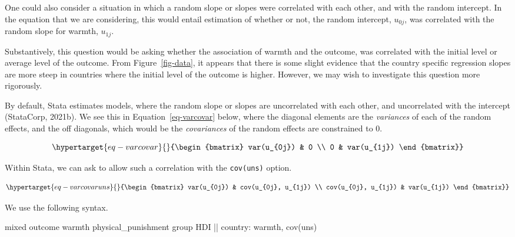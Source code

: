 \documentclass[
  letterpaper,
  DIV=11,
  numbers=noendperiod]{scrreprt}
\newenvironment{Shaded}{\begin{snugshade}}{\end{snugshade}}
\newcommand{\FunctionTok}[1]{\textcolor[rgb]{0.28,0.35,0.67}{#1}}
\newcommand{\NormalTok}[1]{\textcolor[rgb]{0.00,0.23,0.31}{#1}}
\begin{document}
One could also consider a situation in which a random slope or slopes
were correlated with each other, and with the random intercept. In the
equation that we are considering, this would entail estimation of
whether or not, the random intercept, \(u_{0j}\), was correlated with
the random slope for warmth, \(u_{1j}\).

Substantively, this question would be asking whether the association of
warmth and the outcome, was correlated with the initial level or average
level of the outcome. From Figure~\ref{fig-data}, it appears that there
is some slight evidence that the country specific regression slopes are
more steep in countries where the initial level of the outcome is
higher. However, we may wish to investigate this question more
rigorously.

By default, Stata estimates models, where the random slope or slopes are
uncorrelated with each other, and uncorrelated with the intercept
(StataCorp, 2021b). We see this in Equation~\ref{eq-varcovar} below,
where the diagonal elements are the \emph{variances} of each of the
random effects, and the off diagonals, which would be the
\emph{covariances} of the random effects are constrained to 0.

\begin{equation}\protect\hypertarget{eq-varcovar}{}{\begin{bmatrix}
var(u_{0j}) & 0 \\
0 & var(u_{1j}) 
\end{bmatrix}}\label{eq-varcovar}\end{equation}

Within Stata, we can ask to allow such a correlation with the
\texttt{cov(uns)} option.

\begin{equation}\protect\hypertarget{eq-varcovaruns}{}{\begin{bmatrix}
var(u_{0j}) & cov(u_{0j}, u_{1j}) \\
cov(u_{0j}, u_{1j}) & var(u_{1j}) 
\end{bmatrix}}\label{eq-varcovaruns}\end{equation}

We use the following syntax.

\begin{Shaded}
\begin{Highlighting}[]

\NormalTok{mixed outcome warmth physical\_punishment }\FunctionTok{group}\NormalTok{ HDI || country: warmth, cov(uns)}
\end{Highlighting}
\end{Shaded}
\end{document}
